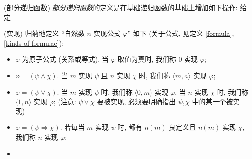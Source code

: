 \begin{definition}
	{(部分递归函数)}
	\emph{部分递归函数}的定义是在基础递归函数的基础上增加如下操作: 给定
\end{definition}


\begin{definition}
	{(实现)}
	归纳地定义 ``自然数 $n$ 实现公式 $\varphi$'' 如下 (关于公式, 见定义 \ref{formula}, \ref{kinds-of-formulae}):
	\begin{itemize}
		\item $\varphi$ 为原子公式 (关系或等式). 当 $\varphi$ 取值为真时, 我们称 $0$ 实现 $\varphi$;
		\item $\varphi = (\psi \land \chi)$. 当 $m$ 实现 $\psi$ 且 $n$ 实现 $\chi$ 时, 我们称 $\langle m,n\rangle$ 实现 $\varphi$;
		\item $\varphi = (\psi \lor \chi)$. 当 $m$ 实现 $\psi$ 时, 我们称 $\langle 0,m\rangle$ 实现 $\varphi$, 当 $n$ 实现 $\chi$ 时, 我们称 $\langle 1,n\rangle$ 实现 $\varphi$; (注意: $\psi\lor\chi$ 要被实现, 必须要明确指出 $\psi,\chi$ 中的某一个被实现)
		\item $\varphi = (\psi \Rightarrow \chi)$. 若每当 $m$ 实现 $\psi$ 时, 都有 $n(m)$ 良定义且 $n(m)$ 实现 $\chi$, 我们称 $n$ 实现 $\varphi$;
		\item 
	\end{itemize}
\end{definition}